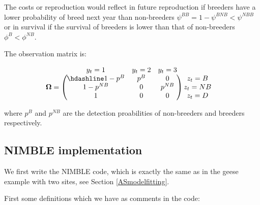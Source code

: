 \documentclass[
  12pt,
]{krantz}
\begin{document}
The costs or reproduction would reflect in future reproduction if breeders have a lower probability of breed next year than non-breeders \(\psi^{BB} = 1 - \psi^{BNB} < \psi^{NBB}\) or in survival if the survival of breeders is lower than that of non-breeders \(\phi^B < \phi^{NB}\).

The observation matrix is:

\[\begin{matrix}
& \\
\mathbf{\Omega} =
    \left ( \vphantom{ \begin{matrix} 12 \\ 12 \\ 12 \end{matrix} } \right .
\end{matrix}
\hspace{-1.2em}
\begin{matrix}
    y_t=1 & y_t=2 & y_t=3 \\ \hdashline
1 - p^B & p^B & 0\\
1 - p^{NB} & 0 & p^{NB}\\
1 & 0 & 0
\end{matrix}
\hspace{-0.2em}
\begin{matrix}
& \\
\left . \vphantom{ \begin{matrix} 12 \\ 12 \\ 12 \end{matrix} } \right )
    \begin{matrix}
    z_{t}=B \\ z_{t}=NB \\ z_{t}=D
    \end{matrix}
\end{matrix}\]

where \(p^B\) and \(p^{NB}\) are the detection proabilities of non-breeders and breeders respectively.

\subsection{NIMBLE implementation}\label{nimble-implementation-2}

We first write the NIMBLE code, which is exactly the same as in the geese example with two sites, see Section \ref{ASmodelfitting}.

First some definitions which we have as comments in the code:
\end{document}
